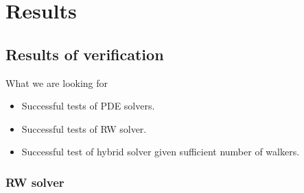 \documentclass[12pt,a4paper, xcolor={usenames,dvipsnames,svgnames,table}]{beamer}
\begin{document}
\section{Results}
\subsection{Results of verification}
\begin{frame}[shrink]{What we are looking for}
\begin{itemize}
 \item Successful tests of PDE solvers.
 \item Successful tests of RW solver.
 \item Successful test of hybrid solver given sufficient number of walkers.
\end{itemize}

\end{frame}
\notetoself{}


% 
% 
% 
% 


\begin{frame}
\frametitle{RW solver}

\end{frame}
\notetoself{}
\end{document}
